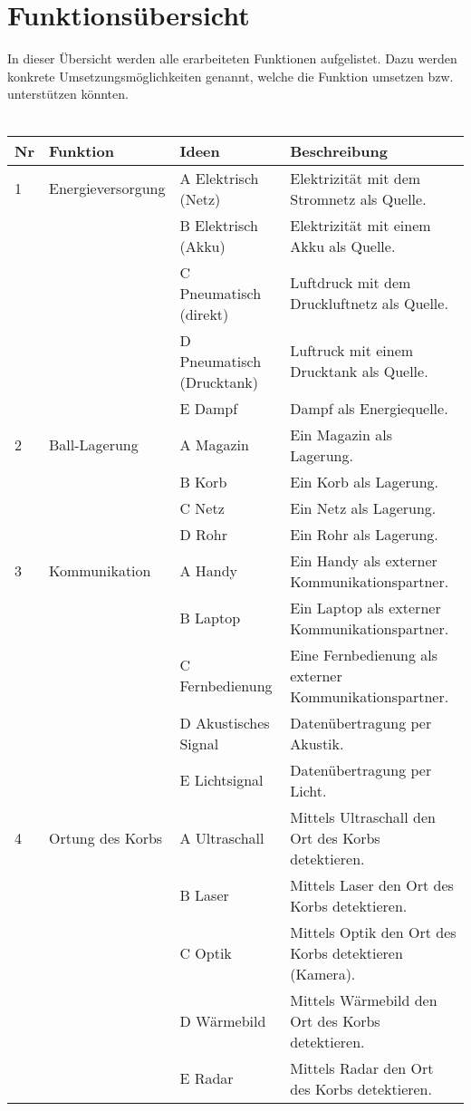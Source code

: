 \section{Funktionsübersicht}
In dieser Übersicht werden alle erarbeiteten Funktionen aufgelistet. Dazu werden konkrete Umsetzungsmöglichkeiten genannt, welche die Funktion umsetzen bzw. unterstützen könnten.\\
\\

\begin{table}[h!]
	\centering
	\begin{tabular}{l p{3cm} p{4.5cm} p{8cm}}
		Nr & Funktion & Ideen & Beschreibung \\
		\hline
		
		1 & Energieversorgung & A Elektrisch (Netz) & Elektrizität mit dem Stromnetz als Quelle. \\
		 &  & B Elektrisch (Akku) & Elektrizität mit einem Akku als Quelle. \\
		 &  & C Pneumatisch (direkt) &  Luftdruck mit dem Druckluftnetz als Quelle. \\
		 &  & D Pneumatisch (Drucktank) & Luftruck mit einem Drucktank als Quelle. \\
		 &  & E Dampf & Dampf als Energiequelle. \\
		
	
	    2 & Ball-Lagerung & A Magazin & Ein Magazin als Lagerung. \\
	    &  & B Korb & Ein Korb als Lagerung. \\
	    &  & C Netz & Ein Netz als Lagerung. \\
	    &  & D Rohr & Ein Rohr als Lagerung. \\
	    
	   
	    
	    3 & Kommunikation & A Handy & Ein Handy als externer Kommunikationspartner. \\
	    &  & B Laptop & Ein Laptop als externer Kommunikationspartner. \\
	    &  & C Fernbedienung & Eine Fernbedienung als externer Kommunikationspartner. \\
	    &  & D Akustisches Signal & Datenübertragung per Akustik. \\
	    &  & E Lichtsignal & Datenübertragung per Licht. \\
	    
	   
	    
	    4 & Ortung des Korbs & A Ultraschall & Mittels Ultraschall den Ort des Korbs detektieren. \\
	    &  & B Laser & Mittels Laser den Ort des Korbs detektieren. \\
	    &  & C Optik & Mittels Optik den Ort des Korbs detektieren (Kamera). \\
	    &  & D Wärmebild & Mittels Wärmebild den Ort des Korbs detektieren. \\
	    &  & E Radar & Mittels Radar den Ort des Korbs detektieren. \\
		

\end{tabular}
\end{table}
